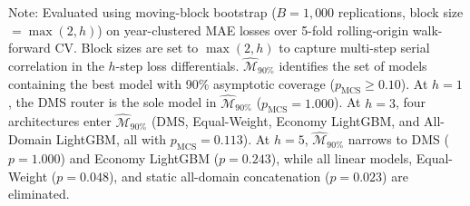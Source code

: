\begin{table}[ht]
\centering
\small
\caption{Hansen, Lunde \& Nason (2011) Model Confidence Set ($\widehat{\mathcal{M}}_{90\%}$) across forecast horizons}
\label{tab:mcs_results}
\begin{flushleft}
\footnotesize Note: Evaluated using moving-block bootstrap ($B=1,000$ replications, block size $= \max(2, h)$) on year-clustered MAE losses over 5-fold rolling-origin walk-forward CV. Block sizes are set to $\max(2, h)$ to capture multi-step serial correlation in the $h$-step loss differentials. $\widehat{\mathcal{M}}_{90\%}$ identifies the set of models containing the best model with 90\% asymptotic coverage ($p_{\text{MCS}} \ge 0.10$). At $h=1$, the DMS router is the sole model in $\widehat{\mathcal{M}}_{90\%}$ ($p_{\text{MCS}} = 1.000$). At $h=3$, four architectures enter $\widehat{\mathcal{M}}_{90\%}$ (DMS, Equal-Weight, Economy LightGBM, and All-Domain LightGBM, all with $p_{\text{MCS}} = 0.113$). At $h=5$, $\widehat{\mathcal{M}}_{90\%}$ narrows to DMS ($p=1.000$) and Economy LightGBM ($p=0.243$), while all linear models, Equal-Weight ($p=0.048$), and static all-domain concatenation ($p=0.023$) are eliminated.
\end{flushleft}
\end{table}